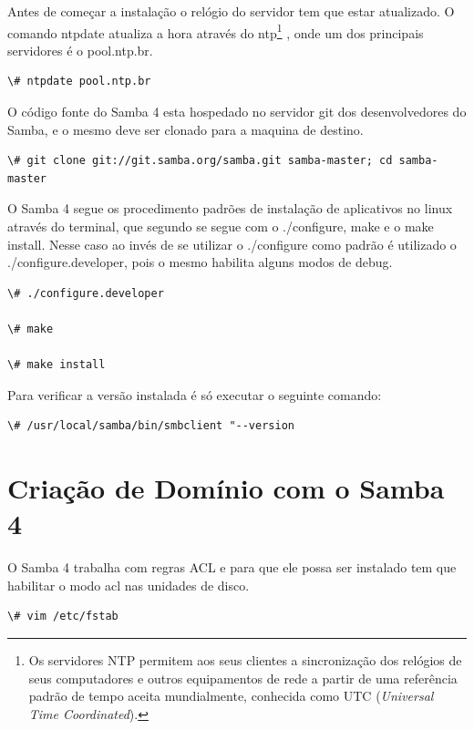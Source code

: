 Antes de começar a instalação o relógio do servidor tem que estar atualizado. O comando ntpdate atualiza a hora através do  ntp\footnote[2]{Os servidores NTP permitem aos seus clientes a sincronização dos relógios de seus computadores e outros equipamentos de rede a partir de uma referência padrão de tempo aceita mundialmente, conhecida como UTC (\textit{Universal Time Coordinated}).\cite{RNP}} , onde um dos principais servidores é o pool.ntp.br.

\begin{lstlisting}
\# ntpdate pool.ntp.br
\end{lstlisting}

O código fonte do Samba 4 esta hospedado no servidor git dos desenvolvedores do Samba, e o mesmo deve ser clonado para a maquina de destino.

\begin{lstlisting}
\# git clone git://git.samba.org/samba.git samba-master; cd samba-master
\end{lstlisting}

O Samba 4 segue os procedimento padrões de instalação de aplicativos no linux através do terminal, que segundo \cite{INSTALL} se segue com o ./configure, make e o make install. Nesse caso ao invés de se utilizar o ./configure como padrão é utilizado o ./configure.developer, pois o mesmo habilita alguns modos de debug.

\begin{lstlisting}
\# ./configure.developer

\# make 

\# make install
\end{lstlisting}

Para verificar a versão instalada é só executar o seguinte comando:

\begin{lstlisting}
\# /usr/local/samba/bin/smbclient "--version
\end{lstlisting}

\section{Criação de Domínio com o Samba 4}

O Samba 4 trabalha com regras ACL e para que ele possa ser instalado tem que habilitar o modo acl nas unidades de disco.

\begin{lstlisting}
\# vim /etc/fstab
\end{lstlisting}

